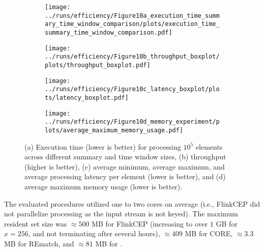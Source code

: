 \begin{figure*}[t]
	\centering
	\begin{subfigure}{.38\linewidth}
		\centering
		\texttt{[image: ../runs/efficiency/Figure10a\_execution\_time\_summary\_time\_window\_comparison/plots/execution\_time\_summary\_time\_window\_comparison.pdf]}
		\vspace{-18pt}
		\caption{}
		\label{plot:execution_time_plot}
	\end{subfigure}
	\hfill
	\begin{subfigure}{.38\linewidth}
		\centering
		\texttt{[image: ../runs/efficiency/Figure10b\_throughput\_boxplot/plots/throughput\_boxplot.pdf]}
		\vspace{-18pt}
		\caption{}
		\label{plot:execution_throughput}
	\end{subfigure}

	\vspace{1em} 
    
	\begin{subfigure}{.38\linewidth}
		\centering
		\texttt{[image: ../runs/efficiency/Figure10c\_latency\_boxplot/plots/latency\_boxplot.pdf]}
		\vspace{-18pt}
		\caption{}
		\label{plot:execution_latency}
	\end{subfigure}
	\hfill
	\begin{subfigure}{.38\linewidth}
		\centering
		\texttt{[image: ../runs/efficiency/Figure10d\_memory\_experiment/plots/average\_maximum\_memory\_usage.pdf]}
		\vspace{-18pt}
		\caption{}
		\label{plot:execution_memory_usage}
	\end{subfigure}

	\vspace{-1em}
	\caption{(a) Execution time (lower is better) for processing $10^5$ elements across different summary and time window sizes, (b) throughput (higher is better), (c) average minimum, average maximum, and average processing latency per element (lower is better), and (d) average maximum memory usage (lower is better).}
	\label{fig:exeuction_time_throughput_latency_memory}
	\vspace{-1em}
\end{figure*}

The evaluated procedures utilized one to two cores on
average (i.e., FlinkCEP did not parallelize processing as the input stream
is not keyed). The maximum resident set size was $\approx500$ MB for
FlinkCEP (increasing to over $1$ GB for $x = 256$, and not terminating after
several hours), $\approx409$ MB for CORE, $\approx 3.3$ MB for REmatch, and
$\approx 81$ MB for \suse{}.

